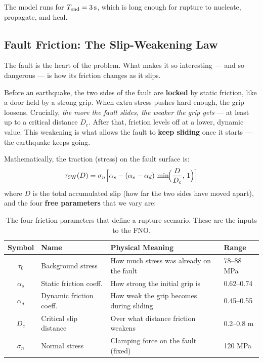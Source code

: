 \documentclass[12pt, a4paper]{article}
\theoremstyle{definition}
\begin{document}
\noindent The model runs for $T_{\rm end} = 3\,\text{s}$, which is long enough
for rupture to nucleate, propagate, and heal.

\subsection{Fault Friction: The Slip-Weakening Law}

The fault is the heart of the problem.  What makes it so interesting — and
so dangerous — is how its friction changes as it slips.

\begin{tcolorbox}[highlight=myorange, title=The Friction Story in Plain English]
  Before an earthquake, the two sides of the fault are \textbf{locked} by
  static friction, like a door held by a strong grip.  When extra stress pushes
  hard enough, the grip loosens.  Crucially, \textit{the more the fault slides,
  the weaker the grip gets} — at least up to a critical distance $D_c$.  After
  that, friction levels off at a lower, dynamic value.  This weakening is what
  allows the fault to \textbf{keep sliding} once it starts — the earthquake
  keeps going.
\end{tcolorbox}

\noindent Mathematically, the traction (stress) on the fault surface is:
\begin{equation}
  \tau_{\rm SW}(D) = \sigma_n \Bigl[
    \alpha_s - (\alpha_s - \alpha_d)\,\min\!\Bigl(\frac{D}{D_c},\,1\Bigr)
  \Bigr]
  \label{eq:sw}
\end{equation}
where $D$ is the total accumulated slip (how far the two sides have moved apart),
and the four \textbf{free parameters} that we vary are:

\begin{table}[H]
  \centering
  \caption{The four friction parameters that define a rupture scenario.
           These are the inputs to the FNO.}
  \label{tab:params}
  \begin{tabular}{clll}
    \toprule
    \textbf{Symbol} & \textbf{Name} & \textbf{Physical Meaning} & \textbf{Range} \\
    \midrule
    $\tau_0$ & Background stress & How much stress was already on the fault & 78–88 MPa \\
    $\alpha_s$ & Static friction coeff. & How strong the initial grip is & 0.62–0.74 \\
    $\alpha_d$ & Dynamic friction coeff. & How weak the grip becomes during sliding & 0.45–0.55 \\
    $D_c$ & Critical slip distance & Over what distance friction weakens & 0.2–0.8 m \\
    \midrule
    $\sigma_n$ & Normal stress & Clamping force on the fault (fixed) & 120 MPa \\
    \bottomrule
  \end{tabular}
\end{table}
\end{document}
